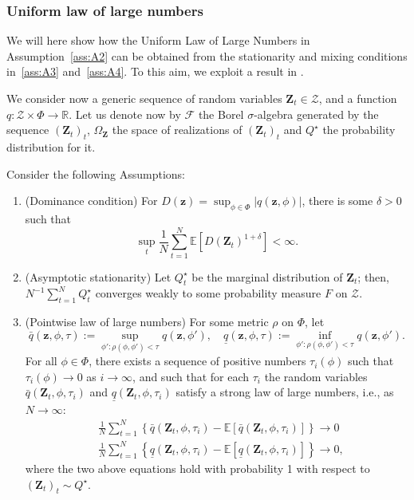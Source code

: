 \documentclass[twoside,11pt]{article}
\newcommand{\E}{\mathbb{E}}
\newcommand{\R}{\mathbb{R}}
\newcommand{\ddz}{\mathbf{z}}
\newcommand{\Ddz}{\mathbf{Z}}
\begin{document}
	
	
	
	
	\subsubsection{Uniform law of large numbers}\label{app:ULLN}
	
	We will here show how the Uniform Law of Large Numbers in Assumption~\ref{ass:A2} can be obtained from the stationarity and mixing conditions in~\ref{ass:A3} and~\ref{ass:A4}. To this aim, we exploit a result in \cite{potscher1989uniform}. 
	
	We consider now a generic sequence of random variables $ \Ddz_t \in \mathcal{Z}$, and a function $ q:\mathcal{Z}\times \Phi\to \R $. 
	Let us denote now by $ \mathcal{F} $ the Borel $ \sigma $-algebra generated by the sequence $ (\Ddz_t)_t $, $ \Omega_\Ddz $ the space of realizations of $ (\Ddz_t)_t $ and $ Q^\star $ the probability distribution for it.	
	
	
	Consider the following Assumptions: 
	
	
	\begin{enumerate}[label=\textbf{C\arabic*}]
		\item \label{ass:B2} (Dominance condition) For $ D(\ddz) = \sup_{\phi \in \Phi } |q(\ddz,\phi) |  $, there is some $ \delta>0 $ such that $$ \sup_t \frac{1}{N}\sum_{t=1}^N \E\left[ D(\Ddz_t)^{1+\delta} \right] <\infty.$$
		\item \label{ass:B3} (Asymptotic stationarity) Let $ Q_t^\star $ be the marginal distribution of $ \Ddz_t $; then, $ N^{-1} \sum_{t=1}^N Q_t^\star $ converges weakly to some probability measure $ F $ on $ \mathcal{Z} $.
		\item \label{ass:B4} (Pointwise law of large numbers) For some metric $ \rho $ on $ \Phi $, let
		\begin{equation}\label{}
		\bar q(\ddz, \phi, \tau) := \sup_{\phi': \rho(\phi, \phi')<\tau} q(\ddz, \phi'), \quad \underline{q} (\ddz, \phi, \tau) := \inf_{\phi': \rho(\phi, \phi')<\tau} q(\ddz, \phi').
		\end{equation}
		For all $ \phi \in \Phi $, there exists a sequence of positive numbers $ \tau_i(\phi) $ such that $ \tau_i(\phi)\to0 $ as $ i\to\infty $, and such that for each $ \tau_i $ the random variables $ \bar q(\Ddz_t, \phi, \tau_i) $ and $ \underline q(\Ddz_t, \phi, \tau_i) $ satisfy a strong law of large numbers, i.e., as $ N\to\infty $:
		\begin{equation}\label{}
		\begin{aligned}
		&\frac{1}{N} \sum_{t=1}^N \left\{\bar q (\Ddz_t, \phi, \tau_i) - \E\left[\bar q (\Ddz_t, \phi, \tau_i)\right] \right\}\to0\\
		&\frac{1}{N} \sum_{t=1}^N \left\{\underline q (\Ddz_t, \phi, \tau_i) - \E\left[\underline q (\Ddz_t, \phi, \tau_i)\right] \right\}\to0,
		\end{aligned}
		\end{equation}
		where the two above equations hold with probability 1 with respect to $ (\Ddz_t)_t \sim Q^\star $.
	\end{enumerate}
	
\end{document}
